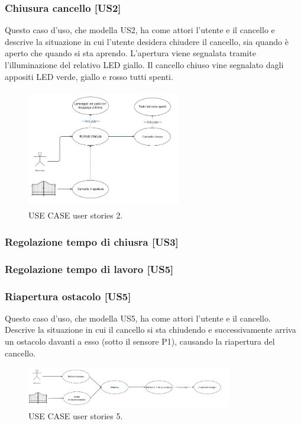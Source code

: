 \documentclass[12pt]{article}
\begin{document}
\subsubsection{Chiusura cancello [US2]}
Questo caso d'uso, che modella US2, ha come attori l'utente e il cancello e descrive la situazione in cui l'utente desidera chiudere il cancello, sia quando è aperto che quando si sta aprendo. L'apertura viene segnalata tramite l'illuminazione del relativo LED giallo. Il cancello chiuso vine segnalato dagli appositi LED verde, giallo e rosso tutti spenti.
\begin{figure}[h]
    \centering
    \includegraphics[width=0.6\textwidth,height=5.2cm]{use_case_us2.PNG}
    \caption{USE CASE user stories 2.}
    \label{fig:use_case_us5}
\end{figure}
\subsubsection{Regolazione tempo di chiusra [US3]}
\subsubsection{Regolazione tempo di lavoro [US5]}
\subsubsection{Riapertura ostacolo [US5]}
Questo caso d'uso, che modella US5, ha come attori l'utente e il cancello. Descrive la situazione in cui il cancello si sta chiudendo e successivamente arriva un ostacolo davanti a esso (sotto il sensore P1), causando la riapertura del cancello.
    \begin{figure}[h]
        \centering
        \includegraphics[width=0.8\textwidth]{use_case_us5.PNG}
        \caption{USE CASE user stories 5.}
        \label{fig:use_case_us5}
    \end{figure}
\end{document}
